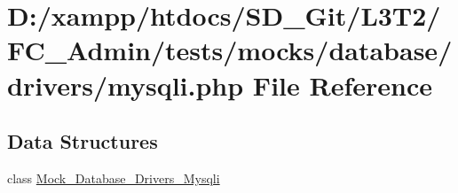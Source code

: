 \hypertarget{drivers_2mysqli_8php}{}\section{D\+:/xampp/htdocs/\+S\+D\+\_\+\+Git/\+L3\+T2/\+F\+C\+\_\+\+Admin/tests/mocks/database/drivers/mysqli.php File Reference}
\label{drivers_2mysqli_8php}
\subsection*{Data Structures}
\begin{DoxyCompactItemize}
\item 
class \hyperlink{class_mock___database___drivers___mysqli}{Mock\+\_\+\+Database\+\_\+\+Drivers\+\_\+\+Mysqli}
\end{DoxyCompactItemize}
